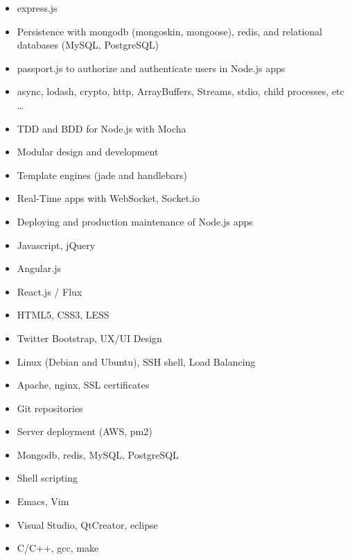 \documentclass[10pt,a4paper]{article}
\begin{document}
 {
    \begin{itemize}
      \item express.js
      \item Persistence with mongodb (mongoskin, mongoose), redis, and
        relational databases (MySQL, PostgreSQL)
      \item passport.js to authorize and authenticate users in Node.js apps
      \item async, lodash, crypto, http, ArrayBuffers, Streams, stdio, child
        processes, etc \ldots
      \item TDD and BDD for Node.js with Mocha
      \item Modular design and development
      \item Template engines (jade and handlebars)
      \item Real-Time apps with WebSocket, Socket.io
      \item Deploying and production maintenance of Node.js apps
    \end{itemize}
}

 {
    \begin{itemize}
      \item Javascript, jQuery
      \item Angular.js
      \item React.js / Flux
      \item HTML5, CSS3, LESS
      \item Twitter Bootstrap, UX/UI Design
    \end{itemize}
}

 {
    \begin{itemize}
      \item Linux (Debian and Ubuntu), SSH shell, Load Balancing
      \item Apache, nginx, SSL certificates
      \item Git repositories
      \item Server deployment (AWS, pm2)
      \item Mongodb, redis, MySQL, PostgreSQL
      \item Shell scripting
    \end{itemize}
}

 {
    \begin{itemize}
      \item Emacs, Vim
      \item Visual Studio, QtCreator, eclipse
      \item C/C++, gcc, make
    \end{itemize}
}
\end{document}
